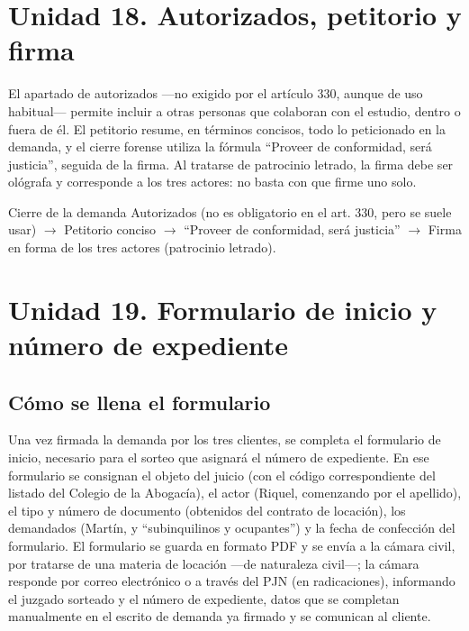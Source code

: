\documentclass[12pt,oneside]{book}
\begin{document}
\section*{Unidad 18. Autorizados, petitorio y firma}

El apartado de autorizados —no exigido por el artículo 330, aunque de uso habitual— permite incluir a otras personas que colaboran con el estudio, dentro o fuera de él. El petitorio resume, en términos concisos, todo lo peticionado en la demanda, y el cierre forense utiliza la fórmula ``Proveer de conformidad, será justicia'', seguida de la firma. Al tratarse de patrocinio letrado, la firma debe ser ológrafa y corresponde a los tres actores: no basta con que firme uno solo.

\begin{definition}{Cierre de la demanda}
Autorizados (no es obligatorio en el art. 330, pero se suele usar) $\rightarrow$ Petitorio conciso $\rightarrow$ ``Proveer de conformidad, será justicia'' $\rightarrow$ Firma en forma de los tres actores (patrocinio letrado).
\end{definition}

\section*{Unidad 19. Formulario de inicio y número de expediente}

\subsection*{Cómo se llena el formulario}

Una vez firmada la demanda por los tres clientes, se completa el formulario de inicio, necesario para el sorteo que asignará el número de expediente. En ese formulario se consignan el objeto del juicio (con el código correspondiente del listado del Colegio de la Abogacía), el actor (Riquel, comenzando por el apellido), el tipo y número de documento (obtenidos del contrato de locación), los demandados (Martín, y ``subinquilinos y ocupantes'') y la fecha de confección del formulario. El formulario se guarda en formato PDF y se envía a la cámara civil, por tratarse de una materia de locación —de naturaleza civil—; la cámara responde por correo electrónico o a través del PJN (en radicaciones), informando el juzgado sorteado y el número de expediente, datos que se completan manualmente en el escrito de demanda ya firmado y se comunican al cliente.
\end{document}
